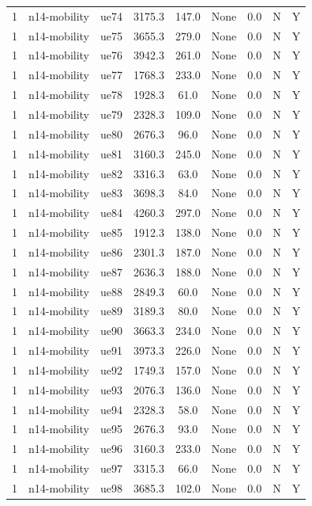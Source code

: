 \begin{table}[ht]
\begin{tabular}{|c|c|c|c|c|c|c|c|c|}
1 & n14-mobility & ue74 & 3175.3 & 147.0 & None & 0.0 & N & Y \\
1 & n14-mobility & ue75 & 3655.3 & 279.0 & None & 0.0 & N & Y \\
1 & n14-mobility & ue76 & 3942.3 & 261.0 & None & 0.0 & N & Y \\
1 & n14-mobility & ue77 & 1768.3 & 233.0 & None & 0.0 & N & Y \\
1 & n14-mobility & ue78 & 1928.3 & 61.0 & None & 0.0 & N & Y \\
1 & n14-mobility & ue79 & 2328.3 & 109.0 & None & 0.0 & N & Y \\
1 & n14-mobility & ue80 & 2676.3 & 96.0 & None & 0.0 & N & Y \\
1 & n14-mobility & ue81 & 3160.3 & 245.0 & None & 0.0 & N & Y \\
1 & n14-mobility & ue82 & 3316.3 & 63.0 & None & 0.0 & N & Y \\
1 & n14-mobility & ue83 & 3698.3 & 84.0 & None & 0.0 & N & Y \\
1 & n14-mobility & ue84 & 4260.3 & 297.0 & None & 0.0 & N & Y \\
1 & n14-mobility & ue85 & 1912.3 & 138.0 & None & 0.0 & N & Y \\
1 & n14-mobility & ue86 & 2301.3 & 187.0 & None & 0.0 & N & Y \\
1 & n14-mobility & ue87 & 2636.3 & 188.0 & None & 0.0 & N & Y \\
1 & n14-mobility & ue88 & 2849.3 & 60.0 & None & 0.0 & N & Y \\
1 & n14-mobility & ue89 & 3189.3 & 80.0 & None & 0.0 & N & Y \\
1 & n14-mobility & ue90 & 3663.3 & 234.0 & None & 0.0 & N & Y \\
1 & n14-mobility & ue91 & 3973.3 & 226.0 & None & 0.0 & N & Y \\
1 & n14-mobility & ue92 & 1749.3 & 157.0 & None & 0.0 & N & Y \\
1 & n14-mobility & ue93 & 2076.3 & 136.0 & None & 0.0 & N & Y \\
1 & n14-mobility & ue94 & 2328.3 & 58.0 & None & 0.0 & N & Y \\
1 & n14-mobility & ue95 & 2676.3 & 93.0 & None & 0.0 & N & Y \\
1 & n14-mobility & ue96 & 3160.3 & 233.0 & None & 0.0 & N & Y \\
1 & n14-mobility & ue97 & 3315.3 & 66.0 & None & 0.0 & N & Y \\
1 & n14-mobility & ue98 & 3685.3 & 102.0 & None & 0.0 & N & Y \\

\end{tabular}
\end{table}

